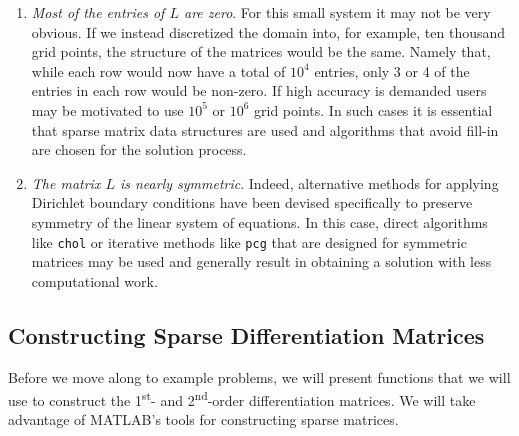 \begin{enumerate}
\item \emph{Most of the entries of $L$ are zero}.  For this small system it may not be very obvious. If we instead discretized the domain into, for example, ten thousand grid points, the structure of the matrices would be the same.  Namely that, while each row would now have a total of $10^4$ entries, only 3 or 4 of the entries in each row would be non-zero.  If high accuracy is demanded users may be motivated to use $10^5$ or $10^6$ grid points.  In such cases it is essential that sparse matrix data structures are used and algorithms that avoid fill-in are chosen for the solution process.

\item \emph{The matrix $L$ is nearly symmetric}.  Indeed, alternative methods for applying Dirichlet boundary conditions have been devised specifically to preserve symmetry of the linear system of equations.  In this case, direct algorithms like \lstinline[style=myMatlab]{chol} or iterative methods like \lstinline[style=myMatlab]{pcg} that are designed for symmetric matrices may be used and generally result in obtaining a solution with less computational work.  
\end{enumerate}

\subsection{Constructing Sparse Differentiation Matrices}
Before we move along to example problems, we will present functions that we will use to construct the 1\textsuperscript{st}- and 2\textsuperscript{nd}-order differentiation matrices.  We will take advantage of MATLAB's tools for constructing sparse matrices.

